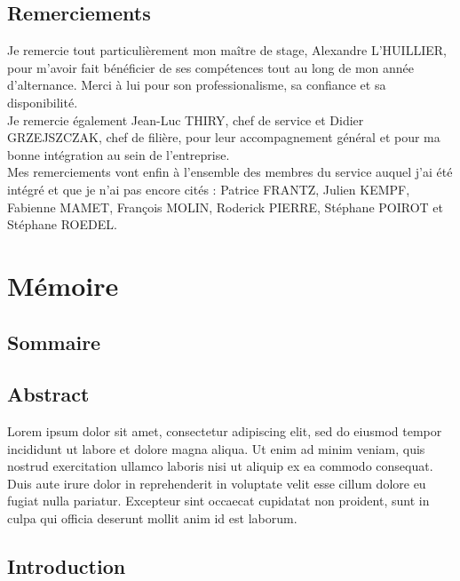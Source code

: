 \documentclass[a4paper, 12pt]{report}
\begin{document}
\chapter*{Remerciements}
\thispagestyle{empty}

Je remercie tout particulièrement mon maître de stage, Alexandre L'HUILLIER, pour m'avoir fait bénéficier de ses compétences tout au long de mon année d'alternance. Merci à lui pour son professionalisme, sa confiance et sa disponibilité.\\

Je remercie également Jean-Luc THIRY, chef de service et Didier GRZEJSZCZAK, chef de filière, pour leur accompagnement général et pour ma bonne intégration au sein de l'entreprise.\\

Mes remerciements vont enfin à l'ensemble des membres du service auquel j'ai été intégré et que je n'ai pas encore cités : Patrice FRANTZ, Julien KEMPF, Fabienne MAMET, François MOLIN, Roderick PIERRE, Stéphane POIROT et Stéphane ROEDEL.

\part{Mémoire}
\renewcommand{\clearpage}{}
\chapter*{Sommaire}
\renewcommand\ptctitle{}
\parttoc
\thispagestyle{empty}
\renewcommand{\clearpage}{\newpage}
\clearpage

\chapter*{Abstract}

Lorem ipsum dolor sit amet, consectetur adipiscing elit, sed do eiusmod tempor incididunt ut labore et dolore magna aliqua. Ut enim ad minim veniam, quis nostrud exercitation ullamco laboris nisi ut aliquip ex ea commodo consequat. Duis aute irure dolor in reprehenderit in voluptate velit esse cillum dolore eu fugiat nulla pariatur. Excepteur sint occaecat cupidatat non proident, sunt in culpa qui officia deserunt mollit anim id est laborum.

\chapter*{Introduction}
\end{document}
